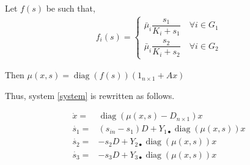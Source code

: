 \documentclass[processes,article,submit,moreauthors,pdftex]{Definitions/mdpi}
\newcommand{\R}{\mathbb{R}}
\DeclareMathOperator{\diag}{diag}
\begin{document}
Let $f(s)$ be such that,
%
\begin{align}
f_i(s) = \begin{cases}
\bar{\mu}_i \dfrac{s_1}{K_i + s_1} \quad \forall i \in G_1 \\
\bar{\mu}_i \dfrac{s_2}{K_i + s_2} \quad \forall i \in G_2
\end{cases}
\end{align}

Then $\mu(x,s) = \diag(f(s))(1_{n\times 1} + Ax)$

Thus, system \eqref{system} is rewritten as follows. 

\begin{align}
\label{Eq1}	\dot{x} = & \diag(\mu(x,s) - D_{n\times 1})x \\
\label{Eq2}	\dot{s_1} = & (s_{in}-s_1)D + Y_{1\bullet} \diag(\mu(x,s))x \\
\label{Eq3}	\dot{s_2} = & -s_2D+
Y_{2\bullet} \diag(\mu(x,s))x\\	
\label{Eq4}	\dot{s_3} = & -s_3D+Y_{3\bullet} \diag(\mu(x,s))x 
\end{align} 
\end{document}
